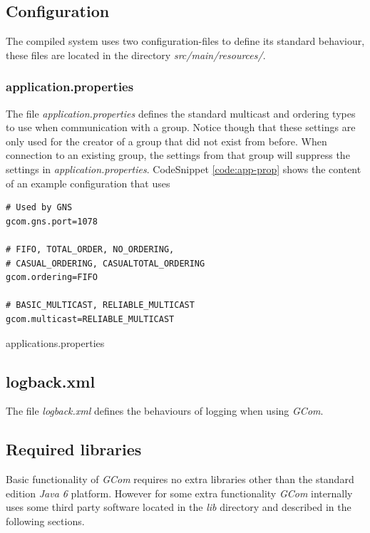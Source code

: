 \documentclass[titlepage, twocolumn, a4paper, 10pt]{article}
\begin{document}
\subsection{Configuration}\label{sec:configuration}
The compiled system uses two configuration-files to define its
standard behaviour, these files are located in the directory
\textit{src/main/resources/}.

\subsubsection{application.properties}\label{sec:application.properties}
The file \textit{application.properties} defines the standard
multicast and ordering types to use when communication with a group.
Notice though that these settings are only used for the creator of a
group that did not exist from before. When connection to an existing
group, the settings from that group will suppress the settings in
\textit{application.properties}. CodeSnippet \ref{code:app-prop}
shows the content of an example configuration that uses

\begin{code}
  \begin{footnotesize}
\begin{verbatim}
# Used by GNS
gcom.gns.port=1078

# FIFO, TOTAL_ORDER, NO_ORDERING,
# CASUAL_ORDERING, CASUALTOTAL_ORDERING
gcom.ordering=FIFO

# BASIC_MULTICAST, RELIABLE_MULTICAST
gcom.multicast=RELIABLE_MULTICAST
\end{verbatim}
  \end{footnotesize}
  \caption{applications.properties}\label{code:app-prop}
\end{code}

\subsection{logback.xml}\label{sec:logback.xml}
The file \textit{logback.xml} defines the behaviours of logging when
using \textit{GCom}.

\subsection{Required libraries}\label{sec:required-libraries}
Basic functionality of \textit{GCom} requires no extra libraries other
than the standard edition \textit{Java 6} platform. However for some
extra functionality \textit{GCom} internally uses some third party
software located in the \textit{lib} directory and described in the
following sections.
\end{document}

